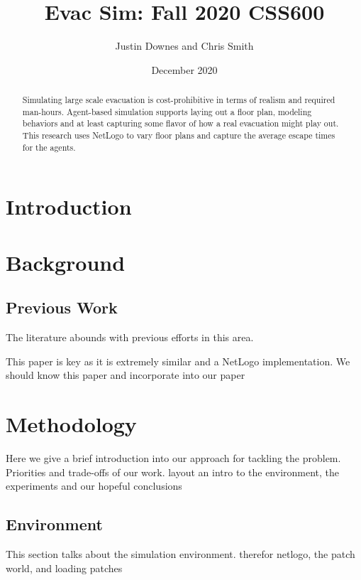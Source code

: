 \documentclass[12pt,letterpaper]{article}
\begin{document}
\title{Evac Sim: Fall 2020 CSS600 }

\author{Justin Downes and Chris Smith}
\date{December 2020}
\maketitle

\begin{abstract}
Simulating large scale evacuation is cost-prohibitive in terms of realism and
required man-hours. Agent-based simulation supports laying out a floor plan,
modeling behaviors and at least capturing some flavor of how a real evacuation
might play out. This research uses NetLogo to vary floor plans and capture the
average escape times for the agents.
\end{abstract}
\section {Introduction}
\section {Background}
\subsection{Previous Work}
The literature abounds with previous efforts in this area.
\cite{almeidaCrowdSimulationModeling2013} 
\cite{kneidl}
\cite{kuligowskil}
\cite{abmEvac}
\cite{zhouSimulationPedestrianEvacuation2019}

This paper is key as it is extremely similar and a NetLogo implementation.  We should know this paper and incorporate into our paper \cite{prioritEvac}

\section {Methodology}

Here we give a brief introduction into our approach for tackling the problem.  Priorities and trade-offs of our work. layout an intro to the environment, the experiments and our hopeful conclusions

\subsection{Environment}
This section talks about the simulation environment.  therefor netlogo, the patch world, and loading patches
\end{document}

